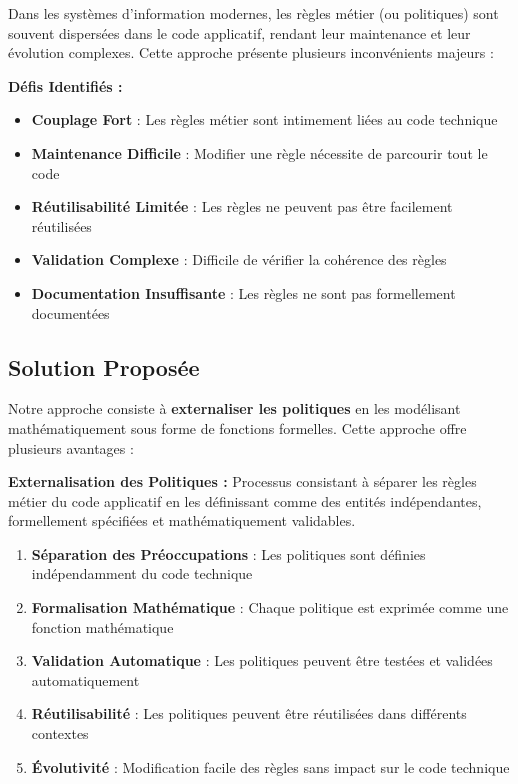 \documentclass[12pt,a4paper]{article}
\begin{document}
    Dans les systèmes d'information modernes, les règles métier (ou politiques) sont souvent dispersées dans le code applicatif, rendant leur maintenance et leur évolution complexes. Cette approche présente plusieurs inconvénients majeurs :

    \begin{warningbox}
        \textbf{Défis Identifiés :}
        \begin{itemize}
            \item \textbf{Couplage Fort} : Les règles métier sont intimement liées au code technique
            \item \textbf{Maintenance Difficile} : Modifier une règle nécessite de parcourir tout le code
            \item \textbf{Réutilisabilité Limitée} : Les règles ne peuvent pas être facilement réutilisées
            \item \textbf{Validation Complexe} : Difficile de vérifier la cohérence des règles
            \item \textbf{Documentation Insuffisante} : Les règles ne sont pas formellement documentées
        \end{itemize}
    \end{warningbox}

    \subsection{Solution Proposée}

    Notre approche consiste à \textbf{externaliser les politiques} en les modélisant mathématiquement sous forme de fonctions formelles. Cette approche offre plusieurs avantages :

    \begin{definitionbox}
        \textbf{Externalisation des Politiques :} Processus consistant à séparer les règles métier du code applicatif en les définissant comme des entités indépendantes, formellement spécifiées et mathématiquement validables.
    \end{definitionbox}

    \begin{enumerate}
        \item \textbf{Séparation des Préoccupations} : Les politiques sont définies indépendamment du code technique
        \item \textbf{Formalisation Mathématique} : Chaque politique est exprimée comme une fonction mathématique
        \item \textbf{Validation Automatique} : Les politiques peuvent être testées et validées automatiquement
        \item \textbf{Réutilisabilité} : Les politiques peuvent être réutilisées dans différents contextes
        \item \textbf{Évolutivité} : Modification facile des règles sans impact sur le code technique
    \end{enumerate}
\end{document}
